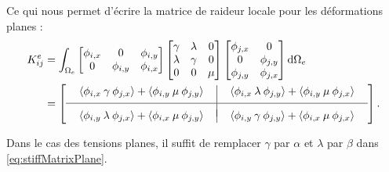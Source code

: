 \documentclass[12pt]{article}
\begin{document}
Ce qui nous permet d'écrire la matrice de raideur locale pour les déformations
planes :
\begin{equation}
    \begin{aligned}
        K_{ij}^e &= \int_{\Omega_e}
        \begin{bmatrix}
            \phi_{i,x} & 0 & \phi_{i,y}\\
            0 & \phi_{i,y} & \phi_{i,x}
        \end{bmatrix} 
        \begin{bmatrix}
            \gamma & \lambda & 0\\
            \lambda & \gamma & 0\\
            0 & 0 & \mu
        \end{bmatrix}
        \begin{bmatrix}
            \phi_{j,x} & 0\\
            0 & \phi_{j,y}\\
            \phi_{j,y} & \phi_{j,x}
        \end{bmatrix} \dd \Omega_e\\
        &=
        \left[
            \setlength{\arraycolsep}{12pt}
            \begin{array}{c|c}
                \langle\phi_{i,x} \:\gamma  \: \phi_{j,x}\rangle 
                + \langle\phi_{i,y} \: \mu \: \phi_{j,y}\rangle &
                \langle\phi_{i,x} \:\lambda \: \phi_{j,y}\rangle 
                + \langle\phi_{i,y} \: \mu \: \phi_{j,x}\rangle\\[1ex]
                \hline & \\[-1.5ex]
                \langle\phi_{i,y} \:\lambda \: \phi_{j,x}\rangle 
                + \langle\phi_{i,x} \: \mu \: \phi_{j,y}\rangle &
                \langle\phi_{i,y} \:\gamma  \: \phi_{j,y}\rangle 
                + \langle\phi_{i,x} \: \mu \: \phi_{j,x}\rangle
            \end{array}
        \right].
    \end{aligned} \label{eq:stiffMatrixPlane}
\end{equation}

Dans le cas des tensions planes, il suffit de remplacer $\gamma$ par $\alpha$ 
et $\lambda$ par $\beta$ dans \eqref{eq:stiffMatrixPlane}.
\end{document}
